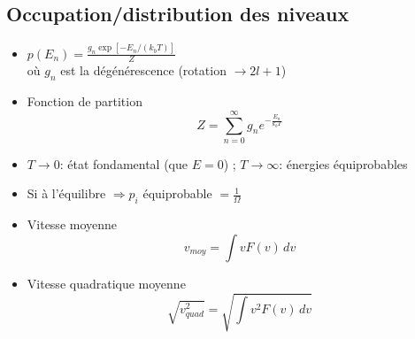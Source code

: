 \subsection*{Occupation/distribution des niveaux}
\begin{itemize}
	\item \(p(E_n)=\frac{g_n \exp\left[-E_n/(k_bT)\right]}{Z}\)\\
	où \(g_n\) est la dégénérescence (rotation \(\rightarrow 2l+1\))
	\item Fonction de partition
	\begin{equation}
	Z = \sum_{n=0}^\infty g_n e^{-\frac{E_n}{k_bT}}
	\end{equation}
	\item \(T\to 0\): état fondamental (que \(E=0\)) ; \(T\to\infty\): énergies équiprobables
	\item Si à l'équilibre \(\Rightarrow p_i\) équiprobable \(=\frac{1}{\Omega}\)
	\item Vitesse moyenne
	\begin{equation}
	v_{moy}=\int v F(v)\,dv
	\end{equation}
	\item Vitesse quadratique moyenne
	\begin{equation}
	\sqrt{v^2_{quad}}=\sqrt{\int v^2 F(v)\,dv}
	\end{equation}
\end{itemize}
